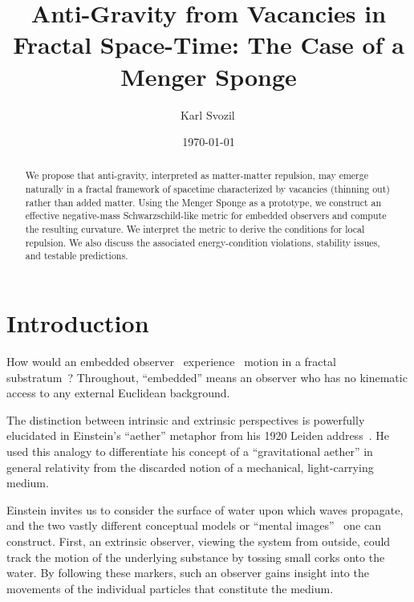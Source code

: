 \documentclass[%
  reprint,
  superscriptaddress,
  showpacs,
  showkeys,
  amsmath,amssymb,
  pra,
  longbibliography,
  floatfix,
]{revtex4-2}
\begin{document}
\title{Anti-Gravity from Vacancies in Fractal Space-Time: The Case of a Menger Sponge}

\author{Karl Svozil\,}

\date{\today}

\begin{abstract}
We propose that anti-gravity, interpreted as matter-matter repulsion, may emerge naturally in a fractal framework of spacetime characterized by vacancies (thinning out) rather than added matter. Using the Menger Sponge as a prototype, we construct an effective negative-mass Schwarzschild-like metric for embedded observers and compute the resulting curvature. We interpret the metric to derive the conditions for local repulsion. We also discuss the associated energy-condition violations, stability issues, and testable predictions.
\end{abstract}


\maketitle

\section{Introduction}
\label{sec:intro}

How would an embedded observer~\cite{toffoli:79,svozil-94} experience~\cite{sv1} motion in a fractal~\cite{falconer1} substratum~\cite{Ord-83}? Throughout, ``embedded'' means an observer who has no kinematic access to any external Euclidean background.

The distinction between intrinsic and extrinsic perspectives is powerfully elucidated in Einstein's ``aether'' metaphor from his 1920 Leiden address~\cite{einstein-aether-en}. He used this analogy to differentiate his concept of a ``gravitational aether'' in general relativity from the discarded notion of a mechanical, light-carrying medium.

Einstein invites us to consider the surface of water upon which waves propagate, and the two vastly different conceptual models or ``mental images''~\cite{hertz-94e} one can construct. First, an extrinsic observer, viewing the system from outside, could track the motion of the underlying substance by tossing small corks onto the water. By following these markers, such an observer gains insight into the movements of the individual particles that constitute the medium.
\end{document}
